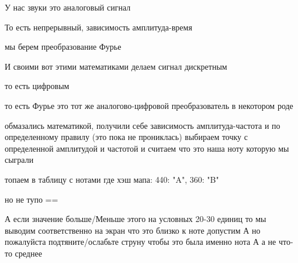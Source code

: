 
У нас звуки это аналоговый сигнал

То есть непрерывный, зависимость амплитуда-время

мы берем преобразование Фурье

И своими вот этими математиками делаем сигнал дискретным

то есть цифровым

то есть Фурье это тот же аналогово-цифровой преобразователь в некотором роде

обмазались математикой, получили себе зависимость амплитуда-частота
и по определенному правилу (это пока не прониклась) выбираем точку с определенной амплитудой и частотой и считаем что это наша ноту которую мы сыграли

топаем в таблицу с нотами где хэш мапа: {440: "A", 360: "B"}

но не тупо ==

А если значение больше/Меньше этого на условных 20-30 единиц то мы выводим соответственно на экран что это близко к ноте допустим А но пожалуйста подтяните/ослабьте струну чтобы это была именно нота А а не что-то среднее